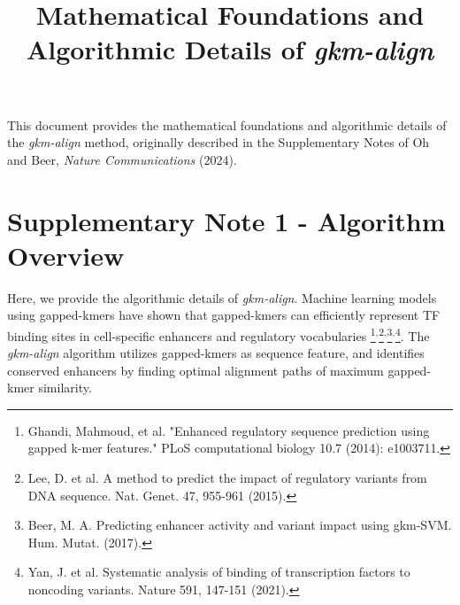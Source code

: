 \documentclass[english]{article}
\title{\textbf{Mathematical Foundations and Algorithmic Details of \textit{gkm-align}}}
\date{}
\begin{document}
\maketitle %

This document provides the mathematical foundations and algorithmic details of the 
\textit{gkm-align} method, originally described in the Supplementary Notes of 
Oh and Beer, \textit{Nature Communications} (2024).

\section{Supplementary Note 1 - Algorithm Overview}

Here, we provide the algorithmic details of \textit{gkm-align}. Machine learning models using gapped-kmers have shown that gapped-kmers can efficiently represent TF binding sites in cell-specific enhancers and regulatory vocabularies \footnote{Ghandi, Mahmoud, et al. "Enhanced regulatory sequence prediction using gapped k-mer features." PLoS computational biology 10.7 (2014): e1003711.}$^{,}$\footnote{Lee, D. et al. A method to predict the impact of regulatory variants from DNA sequence. Nat. Genet. 47, 955-961 (2015).}$^{,}$\footnote{Beer, M. A. Predicting enhancer activity and variant impact using gkm-SVM. Hum. Mutat. (2017).}$^{,}$\footnote{Yan, J. et al. Systematic analysis of binding of transcription factors to noncoding variants. Nature 591, 147-151 (2021).}.
 The \textit{gkm-align} algorithm utilizes gapped-kmers  as sequence feature, and identifies conserved enhancers by finding optimal alignment paths of maximum gapped-kmer similarity.
\end{document}
